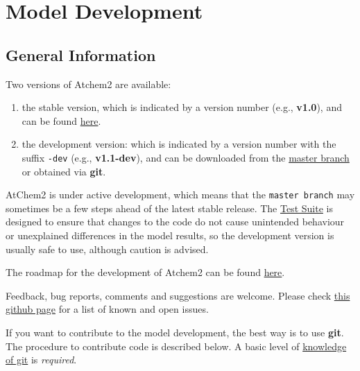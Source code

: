 %
%
%
%
\chapter{Model Development} \label{ch:development}

\section{General Information} \label{sec:information}

Two versions of Atchem2 are available:

\begin{enumerate}
\item the stable version, which is indicated by a version number
  (e.g., \textbf{v1.0}), and can be found
  \href{https://github.com/AtChem/AtChem2/releases}{here}.
\item the development version: which is indicated by a version number
  with the suffix \texttt{-dev} (e.g., \textbf{v1.1-dev}), and can be
  downloaded from the
  \href{https://github.com/AtChem/AtChem2/archive/master.zip}{master
    branch} or obtained via \textbf{git}.
\end{enumerate}

AtChem2 is under active development, which means that the
\texttt{master\ branch} may sometimes be a few steps ahead of the
latest stable release. The \hyperref[sec:testsuite]{Test Suite} is
designed to ensure that changes to the code do not cause unintended
behaviour or unexplained differences in the model results, so the
development version is usually safe to use, although caution is
advised.

The roadmap for the development of Atchem2 can be found
\href{https://github.com/AtChem/AtChem2/projects/1}{here}.

Feedback, bug reports, comments and suggestions are welcome. Please
check \href{https://github.com/AtChem/AtChem2/issues}{this github
  page} for a list of known and open issues.

If you want to contribute to the model development, the best way is to
use \textbf{git}. The procedure to contribute code is described
below. A basic level of
\href{https://swcarpentry.github.io/git-novice/}{knowledge of git} is
\emph{required}.


